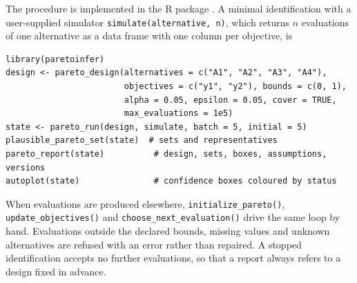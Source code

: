 The procedure is implemented in the R package . A minimal identification with a user-supplied simulator \texttt{simulate(alternative, n)}, which returns $n$ evaluations of one alternative as a data frame with one column per objective, is
\begin{verbatim}
library(paretoinfer)
design <- pareto_design(alternatives = c("A1", "A2", "A3", "A4"),
                        objectives = c("y1", "y2"), bounds = c(0, 1),
                        alpha = 0.05, epsilon = 0.05, cover = TRUE,
                        max_evaluations = 1e5)
state <- pareto_run(design, simulate, batch = 5, initial = 5)
plausible_pareto_set(state)  # sets and representatives
pareto_report(state)          # design, sets, boxes, assumptions, versions
autoplot(state)               # confidence boxes coloured by status
\end{verbatim}
When evaluations are produced elsewhere, \texttt{initialize\_pareto()}, \texttt{update\_objectives()} and \texttt{choose\_next\_evaluation()} drive the same loop by hand. Evaluations outside the declared bounds, missing values and unknown alternatives are refused with an error rather than repaired. A stopped identification accepts no further evaluations, so that a report always refers to a design fixed in advance.
